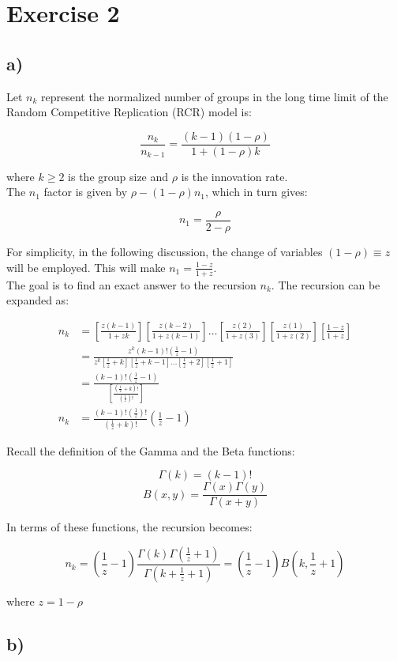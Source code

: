\documentclass{article}
\begin{document}
\section{Exercise 2}

\subsection{a)} Let $n_k$ represent the normalized number of groups in the long time limit of the Random Competitive Replication (RCR) model is:

\[ \frac{n_k}{n_{k-1}} = \frac{(k-1)(1-\rho)}{1+(1-\rho)k}
\]

where $k\geq2$ is the group size and $\rho$ is the innovation rate. \\

The $n_1$ factor is given by $\rho-(1-\rho)n_1$, which in turn gives:

\[ n_1 = \frac{\rho}{2-\rho} \]


For simplicity, in the following discussion, the change of variables $(1-\rho) \equiv z$ will be employed. This will make $n_1 = \frac{1-z}{1+z}$. \\
 
The goal is to find an exact answer to the recursion $n_k$. The recursion can be expanded as:

\begin{align}
 n_k &= [\frac{z(k-1)}{1+zk}][\frac{z(k-2)}{1+z(k-1)}]\dots[\frac{z(2)}{1+z(3)}][\frac{z(1)}{1+z(2)}][\frac{1-z}{1+z}]  \\
 &= \frac{z^k(k-1)!(\frac{1}{z}-1)}{z^k[\frac{1}{z}+k][\frac{1}{z}+k-1]\dots[\frac{1}{z}+2][\frac{1}{z}+1]} \\
 &= \frac{(k-1)!(\frac{1}{z}-1)}{[\frac{(\frac{1}{z}+k)!}{(\frac{1}{z})!}]} \\
 n_k &= \frac{(k-1)!(\frac{1}{z})!}{(\frac{1}{z}+k)!} (\frac{1}{z}-1) 
\end{align}

Recall the definition of the Gamma and the Beta functions:

\[ \Gamma(k) = (k-1)!\]
\[ B(x,y) = \frac{\Gamma(x)\Gamma(y)}{\Gamma(x+y)}\]

In terms of these functions, the recursion becomes:

\[ n_k = (\frac{1}{z}-1) \frac{\Gamma(k) \Gamma(\frac{1}{z}+1)}{\Gamma(k+\frac{1}{z}+1)}  = (\frac{1}{z}-1) B(k,\frac{1}{z}+1)\]

where $z = 1-\rho$

\subsection{b)}
\end{document}
